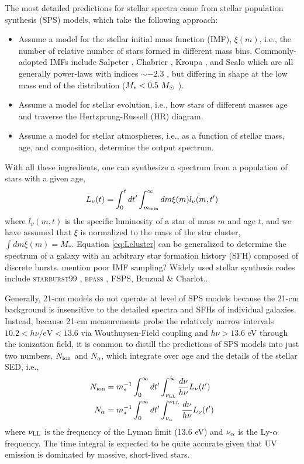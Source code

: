 The most detailed predictions for stellar spectra come from stellar population synthesis (SPS) models, which take the following approach:
\begin{itemize}
	\item Assume a model for the stellar initial mass function (IMF), $\xi(m)$, i.e., the number of relative number of stars formed in different mass bins. Commonly-adopted IMFs include Salpeter \cite{Salpeter1955}, Chabrier \cite{Chabrier2003}, Kroupa \cite{Kroupa2001}, and Scalo \cite{Scalo1998} which are all generally power-laws with indices $\sim -2.3$ , but differing in shape at the low mass end of the distribution ($M_{\ast} < 0.5 \ M_{\odot}$ ).
	\item Assume a model for stellar evolution, i.e., how stars of different masses age and traverse the Hertzprung-Russell (HR) diagram.
	\item Assume a model for stellar atmospheres, i.e., as a function of stellar mass, age, and composition, determine the output spectrum.
\end{itemize}
With all these ingredients, one can synthesize a spectrum from a population of stars with a given age,
\begin{equation}
	L_{\nu}(t) = \int_0^t dt^{\prime} \int_{m_{\text{min}}}^{\infty} dm \xi(m) l_{\nu} (m, t^{\prime}) \label{eq:Lcluster}
\end{equation}
where $l_{\nu}(m, t)$ is the specific luminosity of a star of mass $m$ and age $t$, and we have assumed that $\xi$ is normalized to the mass of the star cluster, $\int dm \xi(m) = M_{\ast}$. Equation \ref{eq:Lcluster} can be generalized to determine the spectrum of a galaxy with an arbitrary star formation history (SFH) composed of discrete bursts. {\color{red} mention poor IMF sampling? Widely used stellar synthesis codes include \textsc{starburst99} \cite{Leitherer1999}, \textsc{bpass} \cite{Eldridge2009}, FSPS, Bruzual \& Charlot...}

Generally, 21-cm models do not operate at level of SPS models because the 21-cm background is insensitive to the detailed spectra and SFHs of individual galaxies. Instead, because 21-cm measurements probe the relatively narrow intervals $10.2 < h\nu / \mathrm{eV} < 13.6$ via Wouthuysen-Field coupling and $h\nu > 13.6$ eV through the ionization field, it is common to distill the predictions of SPS models into just two numbers, $N_{\text{ion}}$ and $N_{\alpha}$, which integrate over age and the details of the stellar SED, i.e.,
\begin{align}
	N_{\text{ion}} & = m_{\ast}^{-1} \int_0^{\infty} dt^{\prime} \int_{\nu_{\text{LL}}}^{\infty} \frac{d\nu}{h\nu} L_{\nu}(t^{\prime}) \\
	N_{\alpha} & = m_{\ast}^{-1} \int_0^{\infty} dt^{\prime} \int_{\nu_{\alpha}}^{\nu_{\text{LL}}} \frac{d\nu}{h\nu} L_{\nu}(t^{\prime}) \nonumber \\
\end{align}
where $\nu_{\text{LL}}$ is the frequency of the Lyman limit (13.6 eV) and $\nu_{\alpha}$ is the Ly-$\alpha$ frequency. The time integral is expected to be quite accurate given that UV emission is dominated by massive, short-lived stars. 

